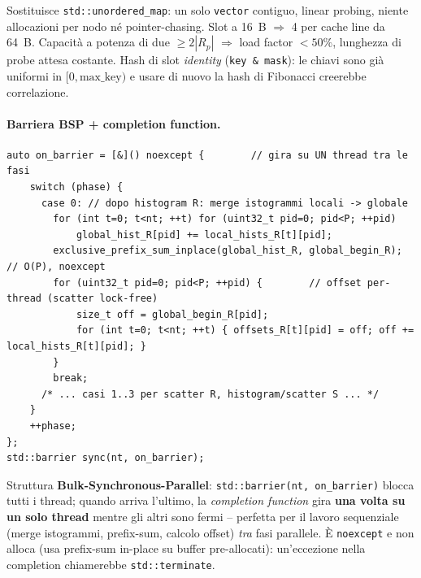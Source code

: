 \documentclass[11pt,a4paper]{article}
\begin{document}
\begin{whybox}
Sostituisce \texttt{std::unordered\_map}: un solo \texttt{vector} contiguo, linear probing, niente allocazioni per nodo né pointer-chasing. Slot a 16~B $\Rightarrow$ 4 per cache line da 64~B. Capacità a potenza di due $\ge 2|R_p|$ $\Rightarrow$ load factor $<50\%$, lunghezza di probe attesa costante. Hash di slot \emph{identity} (\texttt{key \& mask}): le chiavi sono già uniformi in $[0,\text{max\_key})$ e usare di nuovo la hash di Fibonacci creerebbe correlazione.
\end{whybox}

\paragraph{Barriera BSP + completion function.}
\begin{lstlisting}[style=cpp]
auto on_barrier = [&]() noexcept {        // gira su UN thread tra le fasi
    switch (phase) {
      case 0: // dopo histogram R: merge istogrammi locali -> globale
        for (int t=0; t<nt; ++t) for (uint32_t pid=0; pid<P; ++pid)
            global_hist_R[pid] += local_hists_R[t][pid];
        exclusive_prefix_sum_inplace(global_hist_R, global_begin_R); // O(P), noexcept
        for (uint32_t pid=0; pid<P; ++pid) {        // offset per-thread (scatter lock-free)
            size_t off = global_begin_R[pid];
            for (int t=0; t<nt; ++t) { offsets_R[t][pid] = off; off += local_hists_R[t][pid]; }
        }
        break;
      /* ... casi 1..3 per scatter R, histogram/scatter S ... */
    }
    ++phase;
};
std::barrier sync(nt, on_barrier);
\end{lstlisting}

\begin{whybox}
Struttura \textbf{Bulk-Synchronous-Parallel}: \texttt{std::barrier(nt, on\_barrier)} blocca tutti i thread; quando arriva l'ultimo, la \emph{completion function} gira \textbf{una volta su un solo thread} mentre gli altri sono fermi -- perfetta per il lavoro sequenziale (merge istogrammi, prefix-sum, calcolo offset) \emph{tra} fasi parallele. È \texttt{noexcept} e non alloca (usa prefix-sum in-place su buffer pre-allocati): un'eccezione nella completion chiamerebbe \texttt{std::terminate}.
\end{whybox}
\end{document}

